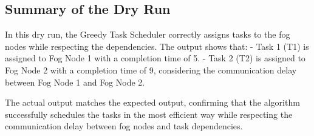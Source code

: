 \documentclass{article}
\begin{document}
\subsection{Summary of the Dry Run}
In this dry run, the Greedy Task Scheduler correctly assigns tasks to the fog nodes while respecting the dependencies. The output shows that:
- Task 1 (T1) is assigned to Fog Node 1 with a completion time of 5.
- Task 2 (T2) is assigned to Fog Node 2 with a completion time of 9, considering the communication delay between Fog Node 1 and Fog Node 2.

The actual output matches the expected output, confirming that the algorithm successfully schedules the tasks in the most efficient way while respecting the communication delay between fog nodes and task dependencies.
\end{document}
